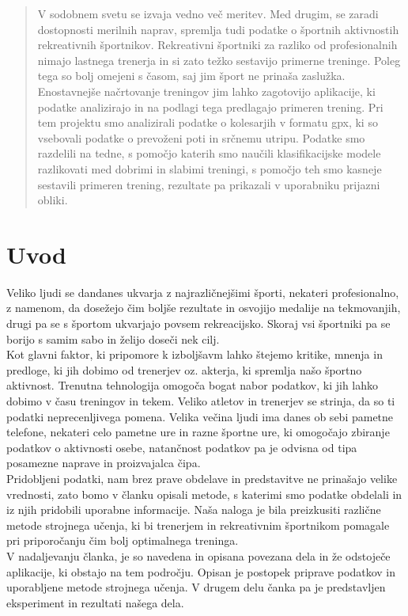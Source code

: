\documentclass{acm_proc_article-sp}
\begin{document}
\maketitle
\begin{abstract}
V sodobnem svetu se izvaja vedno več meritev. Med drugim, se zaradi dostopnosti merilnih naprav, spremlja tudi podatke o športnih aktivnostih rekreativnih športnikov. Rekreativni športniki za razliko od profesionalnih nimajo lastnega trenerja in si zato težko sestavijo primerne treninge. Poleg tega so bolj omejeni s časom, saj jim šport ne prinaša zaslužka. Enostavnejše načrtovanje treningov jim lahko zagotovijo aplikacije, ki podatke analizirajo in na podlagi tega predlagajo primeren trening. Pri tem projektu smo analizirali podatke o kolesarjih v formatu gpx, ki so vsebovali podatke o prevoženi poti in srčnemu utripu. Podatke smo razdelili na tedne, s pomočjo katerih smo naučili klasifikacijske modele razlikovati med dobrimi in slabimi treningi, s pomočjo teh smo kasneje sestavili primeren trening, rezultate pa prikazali v uporabniku prijazni obliki.
\end{abstract}




\section{Uvod}
Veliko ljudi se dandanes ukvarja z najrazličnejšimi športi, nekateri profesionalno, z namenom, da dosežejo čim boljše rezultate in osvojijo medalije na tekmovanjih, drugi pa se s športom ukvarjajo povsem rekreacijsko. Skoraj vsi športniki pa se borijo s samim sabo in želijo doseči nek cilj.\\
Kot glavni faktor, ki pripomore k izboljšavm lahko štejemo kritike, mnenja in predloge, ki jih dobimo od trenerjev oz. akterja, ki spremlja našo športno aktivnost. Trenutna tehnologija omogoča bogat nabor podatkov, ki jih lahko dobimo v času treningov in tekem. Veliko atletov in trenerjev se strinja, da so ti podatki neprecenljivega pomena\cite{Liebermann}. Velika večina ljudi ima danes ob sebi pametne telefone, nekateri celo pametne ure in razne športne ure, ki omogočajo zbiranje podatkov o aktivnosti osebe, natančnost podatkov pa je odvisna od tipa posamezne naprave in proizvajalca čipa\cite{Case}.\\
Pridobljeni podatki, nam brez prave obdelave in predstavitve ne prinašajo velike vrednosti, zato bomo v  članku opisali metode, s katerimi smo podatke obdelali in iz njih pridobili uporabne informacije. Naša naloga je bila preizkusiti različne metode strojnega učenja, ki bi trenerjem in rekreativnim športnikom pomagale pri priporočanju čim bolj optimalnega treninga.\\
V nadaljevanju članka, je so navedena in opisana povezana dela in že odstoječe aplikacije, ki obstajo na tem področju. Opisan je postopek priprave podatkov in uporabljene metode strojnega učenja. V drugem delu čanka pa je predstavljen eksperiment in rezultati našega dela.
\end{document}
